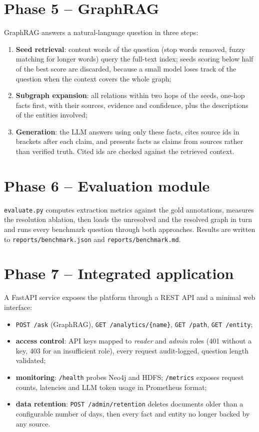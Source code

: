 \documentclass[11pt,a4paper]{report}
\begin{document}
\section{Phase 5 -- GraphRAG}
GraphRAG answers a natural-language question in three steps:
\begin{enumerate}
  \item \textbf{Seed retrieval}: content words of the question (stop words removed, fuzzy matching for longer words)
        query the full-text index; seeds scoring below half of the best score are discarded, because a small model
        loses track of the question when the context covers the whole graph;
  \item \textbf{Subgraph expansion}: all relations within two hops of the seeds, one-hop facts first, with their
        sources, evidence and confidence, plus the descriptions of the entities involved;
  \item \textbf{Generation}: the LLM answers using only these facts, cites source ids in brackets after each claim,
        and presents facts as claims from sources rather than verified truth. Cited ids are checked against the
        retrieved context.
\end{enumerate}

\section{Phase 6 -- Evaluation module}
\texttt{evaluate.py} computes extraction metrics against the gold annotations, measures the resolution ablation,
then loads the unresolved and the resolved graph in turn and runs every benchmark question through both approaches.
Results are written to \texttt{reports/benchmark.json} and \texttt{reports/benchmark.md}.

\section{Phase 7 -- Integrated application}
A FastAPI service exposes the platform through a REST API and a minimal web interface:
\begin{itemize}
  \item \texttt{POST /ask} (GraphRAG), \texttt{GET /analytics/\{name\}}, \texttt{GET /path}, \texttt{GET /entity};
  \item \textbf{access control}: API keys mapped to \emph{reader} and \emph{admin} roles (401 without a key, 403 for an
        insufficient role), every request audit-logged, question length validated;
  \item \textbf{monitoring}: \texttt{/health} probes Neo4j and HDFS; \texttt{/metrics} exposes request counts,
        latencies and LLM token usage in Prometheus format;
  \item \textbf{data retention}: \texttt{POST /admin/retention} deletes documents older than a configurable number of
        days, then every fact and entity no longer backed by any source.
\end{itemize}
\end{document}
